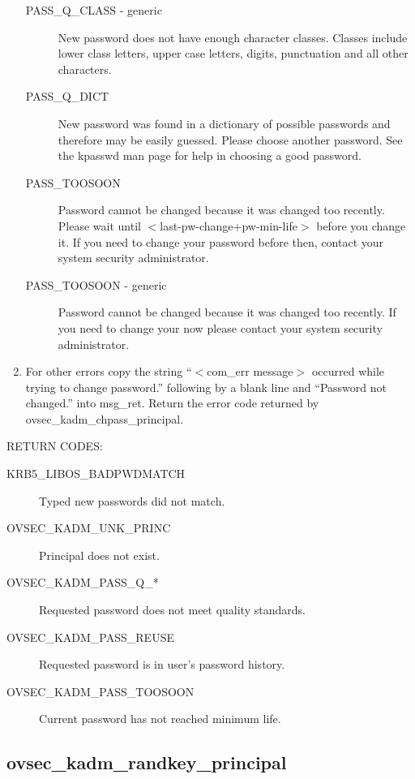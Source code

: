 \begin{enumerate}
\begin{description}
\item[PASS_Q_CLASS - generic]
New password does not have enough character classes. Classes include
lower class letters, upper case letters, digits, punctuation and all
other characters. 

\item[PASS_Q_DICT] 
New password was found in a dictionary of possible passwords and
therefore may be easily guessed.  Please choose another password. See
the kpasswd man page for help in choosing a good password.

\item[PASS_TOOSOON]
Password cannot be changed because it was changed too recently. Please
wait until $<$last-pw-change+pw-min-life$>$ before you change it. If you
need to change your password before then, contact your system
security administrator.

\item[PASS_TOOSOON - generic]
Password cannot be changed because it was changed too recently. If you
need to change your now please contact your system security
administrator.
\end{description}

\item For other errors copy the string ``$<$com_err message$>$ occurred while trying to change password.'' following by a blank line and ``Password not changed.'' into msg_ret. Return the error code returned by ovsec_kadm_chpass_principal.
\end{enumerate}


RETURN CODES:

\begin{description}
\item[KRB5_LIBOS_BADPWDMATCH] Typed new passwords did not match.
\item[OVSEC_KADM_UNK_PRINC] Principal does not exist.
\item[OVSEC_KADM_PASS_Q_*] Requested password does not meet quality
standards. 
\item[OVSEC_KADM_PASS_REUSE] Requested password is in user's
password history. 
\item[OVSEC_KADM_PASS_TOOSOON] Current password has not reached minimum
life. 
\end{description}


\subsection{ovsec_kadm_randkey_principal}

